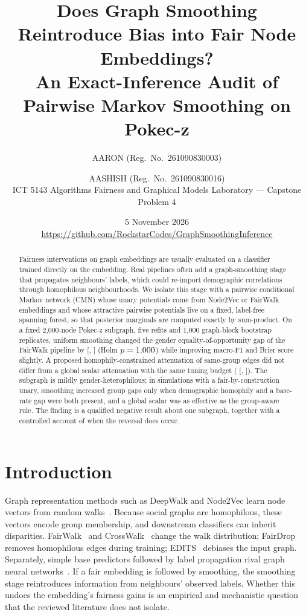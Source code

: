 \documentclass[11pt,a4paper]{article}
\title{Does Graph Smoothing Reintroduce Bias into Fair Node Embeddings?\\\large An Exact-Inference Audit of Pairwise Markov Smoothing on Pokec-z}
\author{AARON (Reg.\ No.\ 261090830003) \and AASHISH (Reg.\ No.\ 261090830016)\\ICT 5143 Algorithms Fairness and Graphical Models Laboratory --- Capstone Problem 4}
\date{5 November 2026\\\small\url{https://github.com/RockstarCodes/GraphSmoothingInference}}
\begin{document}
\maketitle
\begin{abstract}
Fairness interventions on graph embeddings are usually evaluated on a classifier trained directly on the embedding. Real pipelines often add a graph-smoothing stage that propagates neighbours' labels, which could re-import demographic correlations through homophilous neighbourhoods. We isolate this stage with a pairwise conditional Markov network (CMN) whose unary potentials come from Node2Vec or FairWalk embeddings and whose attractive pairwise potentials live on a fixed, label-free spanning forest, so that posterior marginals are computed exactly by sum-product. On a fixed 2{,}000-node Pokec-z subgraph, five refits and 1{,}000 graph-block bootstrap replicates, uniform smoothing changed the gender equality-of-opportunity gap of the FairWalk pipeline by \RHoneEst{} [\RHoneLo, \RHoneHi] (Holm $p=1.000$) while improving macro-F1 and Brier score slightly. A proposed homophily-constrained attenuation of same-group edges did not differ from a global scalar attenuation with the same tuning budget (\RHfourEst{} [\RHfourLo, \RHfourHi]). The subgraph is mildly gender-heterophilous; in simulations with a fair-by-construction unary, smoothing increased group gaps only when demographic homophily and a base-rate gap were both present, and a global scalar was as effective as the group-aware rule. The finding is a qualified negative result about one subgraph, together with a controlled account of when the reversal does occur.
\end{abstract}

\section{Introduction}
Graph representation methods such as DeepWalk and Node2Vec learn node vectors from random walks~\cite{deepwalk,node2vec}. Because social graphs are homophilous, these vectors encode group membership, and downstream classifiers can inherit disparities. FairWalk~\cite{fairwalk} and CrossWalk~\cite{crosswalk} change the walk distribution; FairDrop~\cite{fairdrop} removes homophilous edges during training; EDITS~\cite{edits} debiases the input graph. Separately, simple base predictors followed by label propagation rival graph neural networks~\cite{cs}. If a fair embedding is followed by smoothing, the smoothing stage reintroduces information from neighbours' observed labels. Whether this undoes the embedding's fairness gains is an empirical and mechanistic question that the reviewed literature does not isolate.
\end{document}
